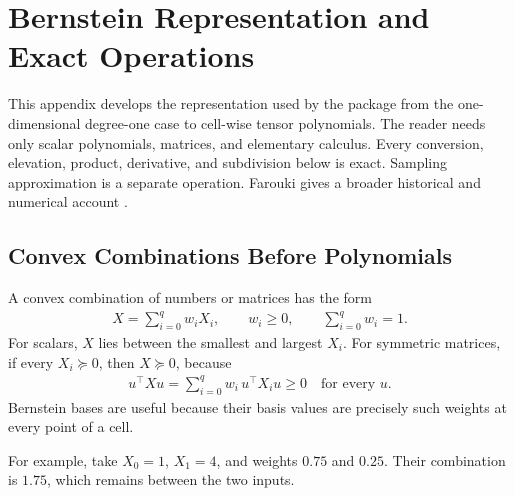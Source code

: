 \chapter{Bernstein Representation and Exact Operations}
\label{app:bernstein-math}

This appendix develops the representation used by the package from the one-dimensional degree-one case to cell-wise tensor polynomials. The reader needs only scalar polynomials, matrices, and elementary calculus. Every conversion, elevation, product, derivative, and subdivision below is exact. Sampling approximation is a separate operation. Farouki gives a broader historical and numerical account \cite{farouki2012}.

\section{Convex Combinations Before Polynomials}

A convex combination of numbers or matrices has the form
\begin{gather*}
X=\sum_{i=0}^{q}w_iX_i,\qquad w_i\ge0,\qquad \sum_{i=0}^{q}w_i=1.
\end{gather*}
For scalars, $X$ lies between the smallest and largest $X_i$.  For symmetric matrices, if every $X_i\succeq0$, then $X\succeq0$, because
\begin{gather*}
  u^\top Xu=\sum_{i=0}^{q}w_i\,u^\top X_i u\ge0
  \quad\text{for every }u.
\end{gather*}
Bernstein bases are useful because their basis values are precisely such weights at every point of a cell.

For example, take $X_0=1$, $X_1=4$, and weights $0.75$ and $0.25$. Their combination is $1.75$, which remains between the two inputs.

\begin{center}
\end{center}


